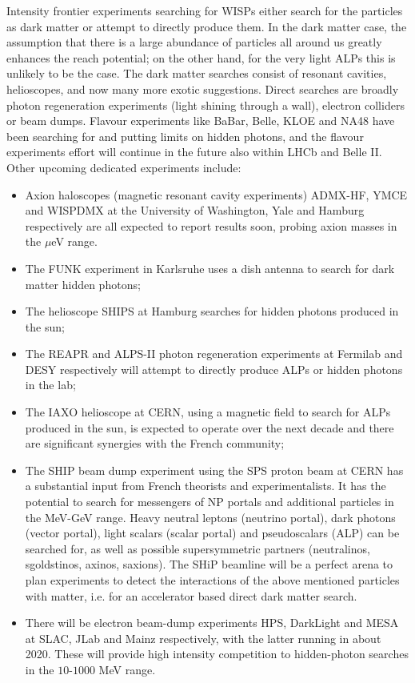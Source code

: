 Intensity frontier experiments searching for WISPs either search for the particles as dark matter or attempt to directly produce them. In the dark matter case, the assumption that there is a large abundance of particles all around us greatly enhances the reach potential; on the other hand, for the very light ALPs this is unlikely to be the case. The dark matter searches consist of resonant cavities, helioscopes, and now many more exotic suggestions. Direct searches are broadly photon regeneration experiments (light shining through a wall), electron colliders or beam dumps. Flavour experiments like BaBar, Belle, KLOE and NA48 have been searching for and putting limits on hidden photons, and the flavour experiments effort will continue in the future also within LHCb and Belle II. Other upcoming dedicated experiments include:
%
\begin{itemize}
\item Axion haloscopes (magnetic resonant cavity experiments) ADMX-HF, YMCE and WISPDMX at the University of Washington, Yale and Hamburg respectively are all expected to report results soon, probing axion masses in the $\mu$eV range. 
\item The FUNK experiment in Karlsruhe uses a dish antenna to search for dark matter hidden photons;
\item The helioscope SHIPS at Hamburg searches for hidden photons produced in the sun;
\item The REAPR and ALPS-II photon regeneration experiments at Fermilab and DESY respectively will attempt to directly produce ALPs or hidden photons in the lab;
\item The IAXO helioscope at CERN, using a magnetic field to search for ALPs produced in the sun, is expected to operate over the next decade and there are significant synergies with the French community;
\item The SHIP  beam dump experiment using the SPS proton beam at CERN has a substantial input from French theorists and experimentalists.  It has the potential to search for messengers of NP portals and additional particles in the MeV-GeV range. Heavy neutral leptons (neutrino portal), dark photons (vector portal), light scalars (scalar portal) and pseudoscalars (ALP) can be searched for, as well as possible supersymmetric partners (neutralinos, sgoldstinos, axinos, saxions).  The SHiP beamline will be a perfect arena to plan experiments to detect the interactions of the above mentioned particles with matter, i.e. for an accelerator based direct dark matter search.
\item There will be electron beam-dump experiments HPS, DarkLight and MESA at SLAC, JLab and Mainz respectively, with the latter running in about 2020. These will provide high intensity competition to hidden-photon searches in the $10$-$1000$ MeV range.

\end{itemize}
